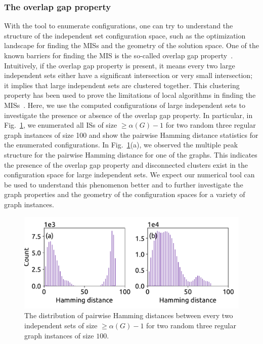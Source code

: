\documentclass[onefignum, onetabnum]{siamart190516}
\newcommand{\<}{\langle}
\renewcommand{\>}{\rangle}
\newcommand{\Fig}[1]{Fig.~\ref{#1}}
\begin{document}
\subsubsection{The overlap gap property}
With the tool to enumerate configurations, one can try to understand the structure of the independent set configuration space, such as the optimization landscape for finding the MISs and the geometry of the solution space. One of the known barriers for finding the MIS is the so-called overlap gap property~\cite{Gamarnik2013, Gamarnik2019}. Intuitively, if the overlap gap property is present, it means every two large independent sets either have a significant intersection or very small intersection; it implies that large independent sets are clustered together. This clustering property has been used to prove the limitations of local algorithms in finding the MISs~\cite{Gamarnik2013, Gamarnik2019}. Here, we use the computed configurations of large independent sets to investigate the presence or absence of the overlap gap property. In particular, in \Fig{fig:hamming}, we enumerated all ISs of size $\geq\alpha(G)-1$ for two random three regular graph instances of size 100 and show the pairwise Hamming distance statistics for the enumerated configurations. In \Fig{fig:hamming}(a), we observed the multiple peak structure for the pairwise Hamming distance for one of the graphs. This indicates the presence of the overlap gap property and disconnected clusters exist in the configuration space for large independent sets. We expect our numerical tool can be used to understand this phenomenon better and to further investigate the graph properties and the geometry of the configuration spaces for a variety of graph instances.
\begin{figure} 
    \centering
    \includegraphics[width=\textwidth, trim={0cm 0cm 0cm 0cm}, clip]{figures/fig3.pdf}
    \caption{The distribution of pairwise Hamming distances between every two independent sets of size $\geq\alpha(G)-1$ for two random three regular graph instances of size $100$.}
    \label{fig:hamming}
\end{figure}
\end{document}
